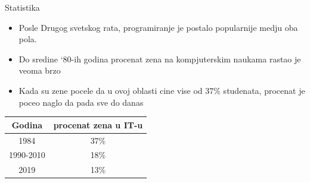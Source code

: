 \documentclass[aspectratio=169]{beamer}
\begin{document}
\begin{frame}{Statistika}

    \begin{itemize}
        \item<1-> Posle Drugog svetskog rata, programiranje je postalo popularnije medju oba pola.
        
        \item<2->Do sredine ‘80-ih godina procenat zena na kompjuterskim naukama rastao je veoma brzo
        
        \item<3-> Kada su zene pocele da u ovoj oblasti cine vise od \alert{37\%} studenata, procenat je poceo naglo da pada sve do danas 
    \end{itemize}

    \begin{table}[h]
        \centering
        \begin{tabular}{c|c}
        \toprule
                Godina    & procenat zena u IT-u \\ 
        \midrule
                1984       & 37\%  \\ 
                1990-2010  & 18\%  \\ 
                2019       & 13\%  \\ 
        \bottomrule
        \end{tabular}
    \end{table}

\end{frame}

\end{document}
